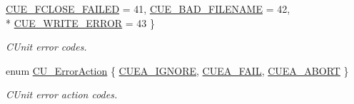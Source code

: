 \begin{DoxyCompactItemize}
\hyperlink{group___framework_gga743a2a025ee3eb792d7d85f0eea347e6aae17fe401deb6eaa939b12e063c564db}{C\+U\+E\+\_\+\+F\+C\+L\+O\+S\+E\+\_\+\+F\+A\+I\+L\+E\+D} = 41, 
\hyperlink{group___framework_gga743a2a025ee3eb792d7d85f0eea347e6ad8d21285b78e3f1c8a5dfde54bce4a68}{C\+U\+E\+\_\+\+B\+A\+D\+\_\+\+F\+I\+L\+E\+N\+A\+M\+E} = 42, 
\\*
\hyperlink{group___framework_gga743a2a025ee3eb792d7d85f0eea347e6ae5246e226eba26a7d746c6db5b523cee}{C\+U\+E\+\_\+\+W\+R\+I\+T\+E\+\_\+\+E\+R\+R\+O\+R} = 43
 \}
\begin{DoxyCompactList}\small\item\em C\+Unit error codes. \end{DoxyCompactList}\item 
enum \hyperlink{group___framework_ga50053b4edbfc96a88027dd57c580ca35}{C\+U\+\_\+\+Error\+Action} \{ \hyperlink{group___framework_gga50053b4edbfc96a88027dd57c580ca35a8d128d9f1ef78818816d62dd5d0a7043}{C\+U\+E\+A\+\_\+\+I\+G\+N\+O\+R\+E}, 
\hyperlink{group___framework_gga50053b4edbfc96a88027dd57c580ca35a88e2ea08ccaf759fdd948051b0c156a7}{C\+U\+E\+A\+\_\+\+F\+A\+I\+L}, 
\hyperlink{group___framework_gga50053b4edbfc96a88027dd57c580ca35a5356f9f4514df11bc7543ac8ea71d66b}{C\+U\+E\+A\+\_\+\+A\+B\+O\+R\+T}
 \}
\begin{DoxyCompactList}\small\item\em C\+Unit error action codes. \end{DoxyCompactList}\end{DoxyCompactItemize}

